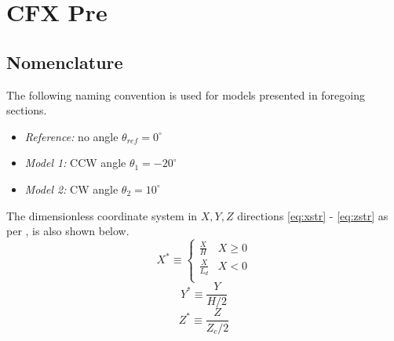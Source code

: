 \chapter{CFX Pre}
\label{ch:pre}

\section{Nomenclature}
\label{sec:nomenclature}

The following naming convention is used for models presented in foregoing sections.
\begin{itemize}
	\item \textit{Reference:} no angle $\theta_{ref}=0^{\circ}$ 
	\item \textit{Model 1:} CCW angle $\theta_1=-20^{\circ}$ 
	\item \textit{Model 2:} CW angle $\theta_2=10^{\circ}$
\end{itemize}

The dimensionless coordinate system in $X,Y,Z$ directions \ref{eq:xstr} - \ref{eq:zstr} as per \cite{art}, is also shown below.
\begin{equation}
	X^* \equiv
	\begin{cases}
		\frac{X}{H}   & X\geq 0 \\
		\frac{X}{L_d} & X < 0   \\
	\end{cases}
	\label{eq:xstr}
\end{equation}
\begin{equation}
	\label{eq:ystr}
	Y^* \equiv \frac{Y}{H/2}
\end{equation}
\begin{equation}
	\label{eq:zstr}
	Z^* \equiv \frac{Z}{Z_c /2}
\end{equation}

